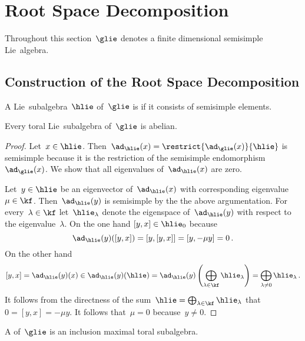 \section{Root Space Decomposition}


\begin{convention}
  Throughout this section~$\glie$ denotes a finite dimensional semisimple Lie~algebra.
\end{convention}





\subsection{Construction of the Root Space Decomposition}


\begin{definition}
  A Lie~subalgebra~$\hlie$ of~$\glie$ is  if it consists of semisimple elements.
\end{definition}


\begin{lemma}
  Every toral Lie~subalgebra of~$\glie$ is abelian.
\end{lemma}


\begin{proof}
  Let~$x \in \hlie$. 
  Then~$\ad_{\hlie}(x) = \restrict{\ad_{\glie}(x)}{\hlie}$ is semisimple because it is the restriction of the semisimple endomorphism~$\ad_{\glie}(x)$.
  We show that all eigenvalues of~$\ad_{\hlie}(x)$ are zero.
  
  Let~$y \in \hlie$ be an eigenvector of~$\ad_{\hlie}(x)$ with corresponding eigenvalue~$\mu \in \kf$.
  Then~$\ad_{\hlie}(y)$ is semisimple by the the above argumentation.
  For every~$\lambda \in \kf$ let~$\hlie_\lambda$ denote the eigenspace of~$\ad_{\hlie}(y)$ with respect to the eigenvalue~$\lambda$.
  On the one hand $[y,x] \in \hlie_0$ because
  \[
    \ad_{\hlie}(y)([y,x])
    =
    [y,[y,x]]
    =
    [y, -\mu y]
    =
    0 \,.
  \]
  On the other hand
  \[
    [y,x]
    =
    \ad_{\hlie}(y)(x)
    \in
    \ad_{\hlie}(y)(\hlie)
    =
    \ad_{\hlie}(y)\left( \bigoplus_{\lambda \in \kf} \hlie_\lambda \right)
    =
    \bigoplus_{\lambda \neq 0} \hlie_\lambda \,.
  \]
  It follows from the directness of the sum~$\hlie = \bigoplus_{\lambda \in \kf} \hlie_\lambda$ that $0 = [y,x] = -\mu y$.
  It follows that~$\mu = 0$ because~$y \neq 0$.
\end{proof}


\begin{definition}
  A  of~$\glie$ is an inclusion maximal toral subalgebra.
\end{definition}


